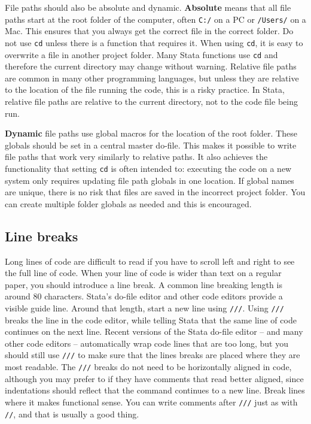 File paths should also be absolute and dynamic.
\textbf{Absolute} means that all
file paths start at the root folder of the computer,
often \texttt{C:/} on a PC or \texttt{/Users/} on a Mac.
This ensures that you always get the correct file in the correct folder.
Do not use \texttt{cd} unless there is a function that requires it.
When using \texttt{cd}, it is easy to overwrite a file in another project folder.
Many Stata functions use \texttt{cd} and therefore the current directory may change without warning.
Relative file paths are common in many other programming languages,
but unless they are relative to the location of the file running the code,
this is a risky practice.
In Stata, relative file paths are relative to the current directory,
not to the code file being run.

\textbf{Dynamic} file paths use global macros for the location of the root folder.
These globals should be set in a central master do-file.
This makes it possible to write file paths that work very similarly to relative paths.
It also achieves the functionality that setting \texttt{cd} is often intended to:
executing the code on a new system only requires updating file path globals in one location.
If global names are unique, there is no risk that files are saved in the incorrect project folder.
You can create multiple folder globals as needed and this is encouraged.


\subsection{Line breaks}

Long lines of code are difficult to read if you have to scroll left and right to see the full line of code.
When your line of code is wider than text on a regular paper, you should introduce a line break.
A common line breaking length is around 80 characters.
Stata's do-file editor and other code editors provide a visible guide line.
Around that length, start a new line using \texttt{///}.
Using \texttt{///} breaks the line in the code editor,
while telling Stata that the same line of code continues on the next line.
Recent versions of the Stata do-file editor --
and many other code editors --
automatically wrap code lines that are too long,
but you should still use \texttt{///} 
to make sure that the lines breaks are placed 
where they are most readable.
The \texttt{///} breaks do not need to be horizontally aligned in code,
although you may prefer to if they have comments that read better aligned,
since indentations should reflect that the command continues to a new line.
Break lines where it makes functional sense.
You can write comments after \texttt{///} just as with \texttt{//}, and that is usually a good thing.

